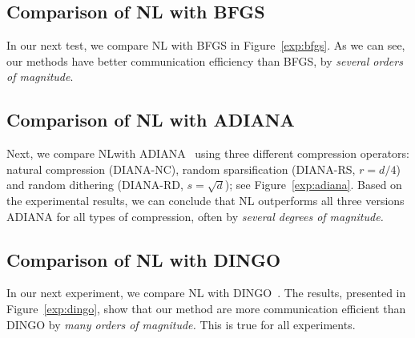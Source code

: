 \documentclass[12pt]{article}
\begin{document}
\subsection{Comparison of {\sf NL} with BFGS}

In our next test, we compare {\sf NL}  with BFGS in Figure~\ref{exp:bfgs}. As we can see, our methods have better communication efficiency than BFGS, by {\em several orders of magnitude}.










\subsection{Comparison of {\sf NL} with ADIANA}

Next, we compare {\sf NL}with ADIANA~\citep{ADIANA} using three different compression operators: natural compression (DIANA-NC),  random sparsification (DIANA-RS, $r = d/4$) and random dithering (DIANA-RD, $s = \sqrt{d}$); see Figure~\ref{exp:adiana}. Based on the experimental results, we can conclude that {\sf NL} outperforms all three versions ADIANA for all types of compression, often by {\em several degrees of magnitude.}








\subsection{Comparison of {\sf NL}  with DINGO}

In our next experiment, we compare {\sf NL} with DINGO~\citep{DINGO2019}. The results, presented  in Figure~\ref{exp:dingo}, show that our method are more communication efficient than DINGO  by {\em many orders of magnitude.} This is true for all  experiments.
\end{document}
